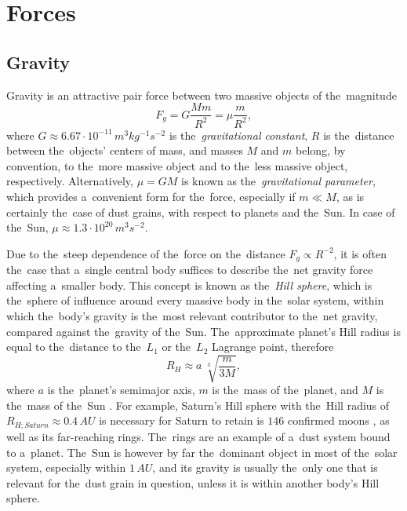 \section{Forces} 

\subsection{Gravity} \label{ch:gravity}

Gravity is an attractive pair force between two massive objects of the~magnitude
\begin{equation}
    F_g = G \frac{M m}{R^2} = \mu \frac{m}{R^2},
\end{equation}
where $G \approx 6.67 \cdot 10^{-11} \, m^3 kg^{-1} s^{-2}$ is the~\textit{gravitational constant}, $R$ is the~distance between the~objects' centers of mass, and masses $M$ and $m$ belong, by convention, to the~more massive object and to the~less massive object, respectively. Alternatively, $\mu = G M$ is known as the~\textit{gravitational parameter}, which provides a~convenient form for the~force, especially if $m \ll M$, as is certainly the~case of dust grains, with respect to planets and the~Sun. In case of the~Sun, $\mu \approx 1.3 \cdot 10^{20} \, \si{m^3 s^{-2}}$.

Due to the~steep dependence of the~force on the~distance $F_g \propto R^{-2}$, it is often the~case that a~single central body suffices to describe the~net gravity force affecting a~smaller body. This concept is known as the~\textit{Hill sphere}, which is the~sphere of influence around every massive body in the~solar system, within which the~body's gravity is the~most relevant contributor to the~net gravity, compared against the~gravity of the~Sun. The~approximate planet's Hill radius is equal to the~distance to the~$L_1$ or the~$L_2$ Lagrange point, therefore 
\begin{equation}
    R_H \approx a~\sqrt[3]{\frac{m}{3M}},
\end{equation}
where $a$ is the~planet's semimajor axis, $m$ is the~mass of the~planet, and $M$ is the~mass of the~Sun \citep{sheppard2023new}. For example, Saturn's Hill sphere with the~Hill radius of $R_{H;Saturn} \approx 0.4 \, \si{AU}$ is necessary for Saturn to retain is $146$ confirmed moons \citep{sheppard2023new}, as well as its far-reaching rings. The~rings are an example of a~dust system bound to a~planet. The~Sun is however by far the~dominant object in most of the~solar system, especially within $1 \, \si{AU}$, and its gravity is usually the~only one that is relevant for the~dust grain in question, unless it is within another body's Hill sphere.

